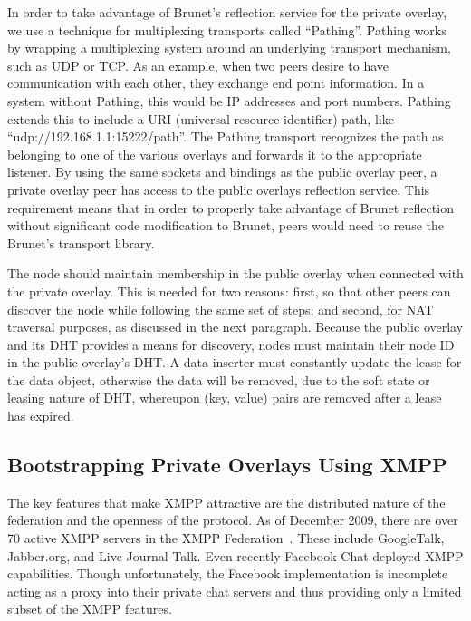 \documentclass[conference]{IEEEtran}
\begin{document}
In order to take advantage of Brunet's reflection service for the private
overlay, we use a technique for multiplexing transports called ``Pathing''.
Pathing works by wrapping a multiplexing system around an underlying transport
mechanism, such as UDP or TCP.  As an example, when two peers desire to have
communication with each other, they exchange end point information.  In a
system without Pathing, this would be IP addresses and port numbers.  Pathing
extends this to include a URI (universal resource identifier) path, like
``udp://192.168.1.1:15222/path''.  The Pathing transport recognizes the path as
belonging to one of the various overlays and forwards it to the appropriate
listener.  By using the same sockets and bindings as the public overlay peer, a
private overlay peer has access to the public overlays reflection service.
This requirement means that in order to properly take advantage of Brunet
reflection without significant code modification to Brunet, peers would need to
reuse the Brunet's transport library.

The node should maintain membership in the public overlay when connected with
the private overlay.  This is needed for two reasons: first, so that other
peers can discover the node while following the same set of steps; and second,
for NAT traversal purposes, as discussed in the next paragraph.  Because the
public overlay and its DHT provides a means for discovery, nodes must maintain
their node ID in the public overlay's DHT.  A data inserter must constantly
update the lease for the data object, otherwise the data will be removed, due
to the soft state or leasing nature of DHT, whereupon (key, value) pairs are
removed after a lease has expired.

\subsection{Bootstrapping Private Overlays Using XMPP}
\label{xmpp_bootstrapping}

The key features that make XMPP attractive are the distributed nature of the
federation and the openness of the protocol.  As of December 2009, there are
over 70 active XMPP servers in the XMPP Federation~\cite{xmpp_servers}.  These
include GoogleTalk, Jabber.org, and Live Journal Talk.  Even recently Facebook
Chat deployed XMPP capabilities.  Though unfortunately, the Facebook
implementation is incomplete acting as a proxy into their private chat servers
and thus providing only a limited subset of the XMPP features.
\end{document}

